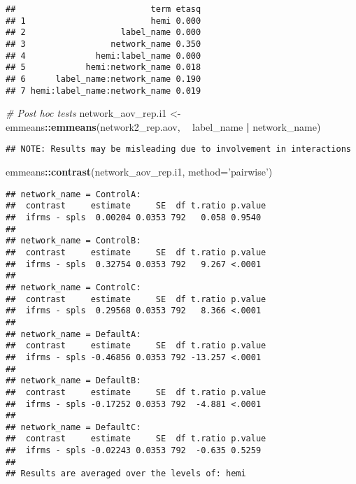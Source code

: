 \documentclass[
]{article}
\newenvironment{Shaded}{\begin{snugshade}}{\end{snugshade}}
\newcommand{\CommentTok}[1]{\textcolor[rgb]{0.56,0.35,0.01}{\textit{#1}}}
\newcommand{\DataTypeTok}[1]{\textcolor[rgb]{0.13,0.29,0.53}{#1}}
\newcommand{\KeywordTok}[1]{\textcolor[rgb]{0.13,0.29,0.53}{\textbf{#1}}}
\newcommand{\NormalTok}[1]{#1}
\newcommand{\OperatorTok}[1]{\textcolor[rgb]{0.81,0.36,0.00}{\textbf{#1}}}
\newcommand{\StringTok}[1]{\textcolor[rgb]{0.31,0.60,0.02}{#1}}
\begin{document}
\begin{verbatim}
##                           term etasq
## 1                         hemi 0.000
## 2                   label_name 0.000
## 3                 network_name 0.350
## 4              hemi:label_name 0.000
## 5            hemi:network_name 0.018
## 6      label_name:network_name 0.190
## 7 hemi:label_name:network_name 0.019
\end{verbatim}

\begin{Shaded}
\begin{Highlighting}[]
\CommentTok{# Post hoc tests}
\NormalTok{network_aov_rep.i1 <-}\StringTok{ }\NormalTok{emmeans}\OperatorTok{::}\KeywordTok{emmeans}\NormalTok{(network2_rep.aov, }\OperatorTok{~}\StringTok{ }\NormalTok{label_name }\OperatorTok{|}\StringTok{ }\NormalTok{network_name)}
\end{Highlighting}
\end{Shaded}

\begin{verbatim}
## NOTE: Results may be misleading due to involvement in interactions
\end{verbatim}

\begin{Shaded}
\begin{Highlighting}[]
\NormalTok{emmeans}\OperatorTok{::}\KeywordTok{contrast}\NormalTok{(network_aov_rep.i1, }\DataTypeTok{method=}\StringTok{'pairwise'}\NormalTok{)}
\end{Highlighting}
\end{Shaded}

\begin{verbatim}
## network_name = ControlA:
##  contrast     estimate     SE  df t.ratio p.value
##  ifrms - spls  0.00204 0.0353 792   0.058 0.9540 
## 
## network_name = ControlB:
##  contrast     estimate     SE  df t.ratio p.value
##  ifrms - spls  0.32754 0.0353 792   9.267 <.0001 
## 
## network_name = ControlC:
##  contrast     estimate     SE  df t.ratio p.value
##  ifrms - spls  0.29568 0.0353 792   8.366 <.0001 
## 
## network_name = DefaultA:
##  contrast     estimate     SE  df t.ratio p.value
##  ifrms - spls -0.46856 0.0353 792 -13.257 <.0001 
## 
## network_name = DefaultB:
##  contrast     estimate     SE  df t.ratio p.value
##  ifrms - spls -0.17252 0.0353 792  -4.881 <.0001 
## 
## network_name = DefaultC:
##  contrast     estimate     SE  df t.ratio p.value
##  ifrms - spls -0.02243 0.0353 792  -0.635 0.5259 
## 
## Results are averaged over the levels of: hemi
\end{verbatim}
\end{document}
